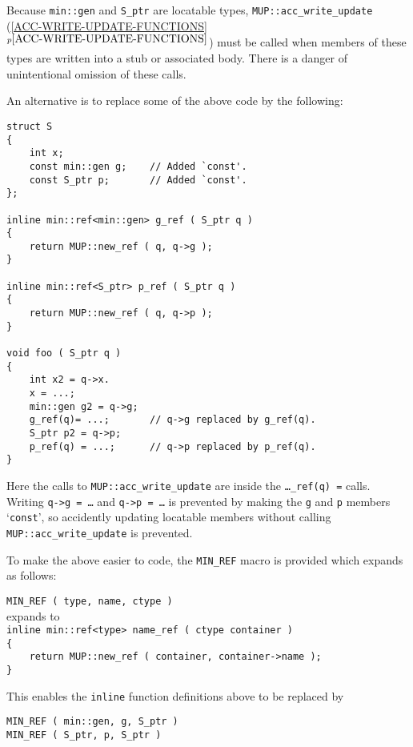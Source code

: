 \documentclass[12pt]{article}
\makeatletter
\newcommand{\ttnbkey}[1]{{\tt #1}\index{#1@{\tt #1}}}
\newcommand{\itemref}[1]{\ref{#1}$^{p\pageref{#1}}$}
\newcommand{\EOL}{\penalty \exhyphenpenalty}
\newenvironment{indpar}[1][0.3in]%
	{\begin{list}{}%
		     {\setlength{\itemsep}{0in}%
		      \setlength{\topsep}{0in}%
		      \setlength{\parsep}{1ex}%
		      \setlength{\labelwidth}{#1}%
		      \setlength{\leftmargin}{#1}%
		      \addtolength{\leftmargin}{\labelsep}}%
	 \item}%
	{\end{list}}
\newcommand{\TTNBKEY}[1]{\ttnbkey{#1}}
\makeatother
\begin{document}
Because {\tt min::gen} and {\tt S\_ptr} are locatable types,
{\tt MUP::\EOL acc\_\EOL write\_\EOL update}
(\itemref{ACC-WRITE-UPDATE-FUNCTIONS}) must be called when
members of these types are written into a stub or associated body.  There is
a danger of unintentional omission of these calls.

An alternative is to replace some of the above code by the following:

\begin{indpar}\begin{verbatim}
struct S
{
    int x;
    const min::gen g;    // Added `const'.
    const S_ptr p;       // Added `const'.
};

inline min::ref<min::gen> g_ref ( S_ptr q )
{
    return MUP::new_ref ( q, q->g );
}

inline min::ref<S_ptr> p_ref ( S_ptr q )
{
    return MUP::new_ref ( q, q->p );
}

void foo ( S_ptr q )
{
    int x2 = q->x.
    x = ...;
    min::gen g2 = q->g;
    g_ref(q)= ...;       // q->g replaced by g_ref(q).
    S_ptr p2 = q->p;
    p_ref(q) = ...;      // q->p replaced by p_ref(q).
}
\end{verbatim}\end{indpar}

Here the calls to {\tt MUP::acc\_write\_update} are inside the
{\tt \ldots\_ref(q) =} calls.  Writing {\tt q->g = \ldots}
and {\tt q->p = \ldots} is prevented by making the {\tt g} and {\tt p}
members `{\tt const}', so accidently updating locatable members
without calling {\tt MUP::\EOL acc\_\EOL write\_\EOL update}
is prevented.

To make the above easier to code, the {\tt MIN\_REF} macro
is provided which expands as follows:

\begin{indpar}
\TTNBKEY{MIN\_REF}\verb| ( type, name, ctype )| \\[1ex]
expands to \\[1ex]
\verb|inline min::ref<type> name_ref ( ctype container )| \\
\verb|{| \\
\verb|    return MUP::new_ref ( container, container->name );| \\
\verb|}|
\end{indpar}

This enables the {\tt inline} function definitions above to be
replaced by

\begin{indpar}\begin{verbatim}
MIN_REF ( min::gen, g, S_ptr )
MIN_REF ( S_ptr, p, S_ptr )
\end{verbatim}\end{indpar}
\end{document}
